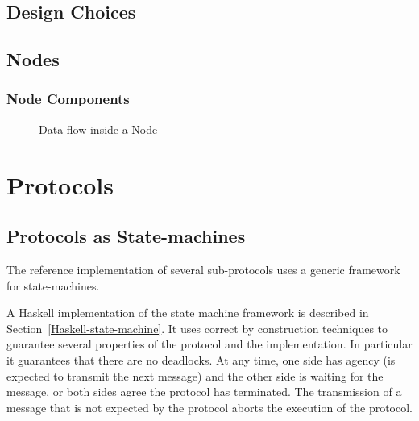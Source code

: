 \documentclass{report}
\newcommand{\wip}[1]{\color{magenta}{#1}\color{black}}
\theoremstyle{definition}{
  \newtheorem{lemma}{Lemma}[section] %
  \newtheorem{definition}[lemma]{Definition}
}
\theoremstyle{theorem}{
  \newtheorem{invariant}[lemma]{Invariant}
  \newtheorem{proofobligation}[lemma]{Proof Obligation}
}
\numberwithin{equation}{lemma}
\begin{document}
\section{Design Choices}
\wip{
\begin{itemize}
\item Only the design choices that have been taken.
\item In this section only the big design choices.
\item Design discussions and details in the discussions section.
\end{itemize}
}

\section{Nodes}
\subsection{Node Components}

\begin{figure}[h]
  \begin{center}
  \end{center}
  \caption{Data flow inside a Node}
  \label{node-diagram-concurency}
\end{figure}

\chapter{Protocols}
\section{Protocols as State-machines}
The reference implementation of several sub-protocols uses a generic framework
for state-machines.

A Haskell implementation of the state machine framework is described in
Section~\ref{Haskell-state-machine}. It uses correct by construction
techniques to guarantee
several properties of the protocol and the implementation.
In particular it guarantees that there are no deadlocks. At any time, one side has agency
(is expected to transmit the next message) and the other side is waiting for the message,
or both sides agree the protocol has terminated.
The transmission of a message that is not expected by the protocol aborts the execution
of the protocol.
\end{document}
